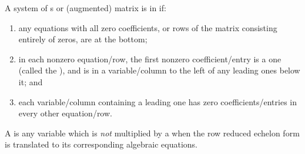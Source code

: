 \begin{definition} \label{def:rref} 
  A system of s or (augmented) matrix is in  if:
  \begin{enumerate}
\item any equations with all zero coefficients, or rows of the matrix consisting entirely of zeros, are at the bottom; 
\item in each nonzero equation\slash row, the first nonzero coefficient\slash entry is a one (called the ), and is in a variable\slash column to the left of any leading ones below it;
and
\item each variable\slash column containing a leading one has zero coefficients\slash entries in every other equation\slash row.\end{enumerate}
A  is any variable which is \emph{not} multiplied by a  when the row reduced echelon form is translated to its corresponding algebraic equations.
\end{definition}


